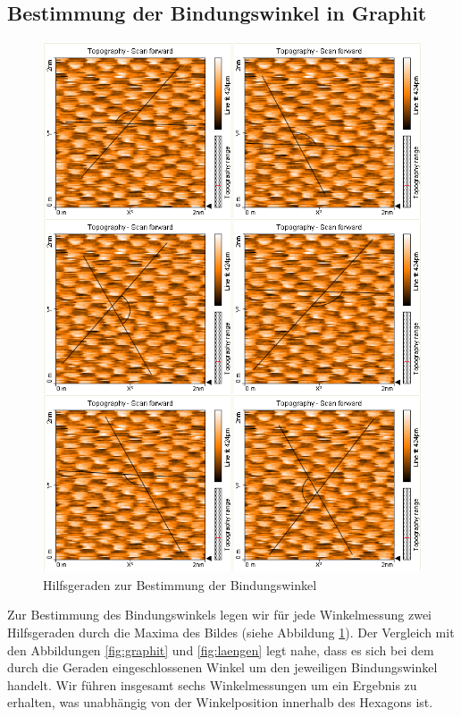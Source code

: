 \documentclass[10pt, a4paper]{article}
\begin{document}
\subsection{Bestimmung der Bindungswinkel in Graphit}
\begin{figure}[h]
\centering
\includegraphics[width=1\textwidth]{./grafiken/collage.png}
\caption{Hilfsgeraden zur Bestimmung der Bindungswinkel}
\label{fig:hilfsgeraden}
\end{figure}
Zur Bestimmung des Bindungswinkels legen wir für jede Winkelmessung zwei Hilfsgeraden durch die Maxima des Bildes (siehe Abbildung \ref{fig:hilfsgeraden}).
Der Vergleich mit den Abbildungen \ref{fig:graphit} und \ref{fig:laengen} legt nahe, dass es sich bei dem durch die Geraden eingeschlossenen Winkel um den jeweiligen Bindungswinkel handelt.
Wir führen insgesamt sechs Winkelmessungen um ein Ergebnis zu erhalten, was unabhängig von der Winkelposition innerhalb des Hexagons ist.
\end{document}
